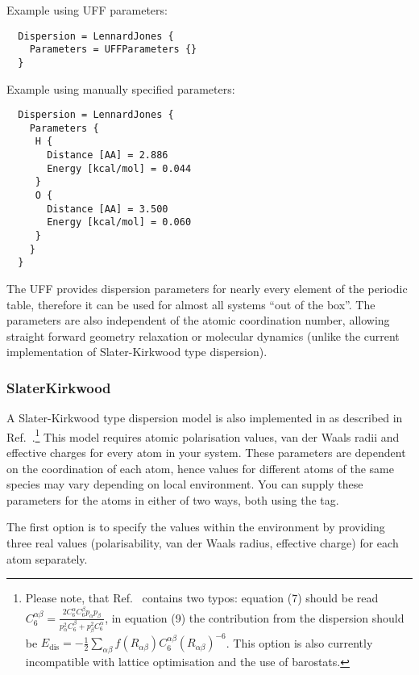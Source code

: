 Example using UFF parameters:\invparskip
\begin{verbatim}
  Dispersion = LennardJones {
    Parameters = UFFParameters {}
  }
\end{verbatim}

Example using manually specified parameters:\invparskip
\begin{verbatim}
  Dispersion = LennardJones {
    Parameters {
     H {
       Distance [AA] = 2.886
       Energy [kcal/mol] = 0.044
     }
     O {
       Distance [AA] = 3.500
       Energy [kcal/mol] = 0.060
     }
    }
  }
\end{verbatim}

The UFF provides dispersion parameters for nearly every element of the
periodic table, therefore it can be used for almost all systems
``out of the box''. The parameters are also independent of the atomic
coordination number, allowing straight forward geometry relaxation or
molecular dynamics (unlike the current implementation of
Slater-Kirkwood type dispersion).


\subsubsection{SlaterKirkwood}
\label{sec:dftbp.SlaterKirkwood}
\label{sec:SlaterKirkwood}

A Slater-Kirkwood type dispersion model is also implemented in
\dftbp{} as described in
Ref.~\cite{elstner-jcp-114-5149}.\footnote{Please note, that
  Ref.~\cite{elstner-jcp-114-5149} contains two typos: equation (7)
  should be read $C_6^{\alpha\beta} = \frac{2 C_6^\alpha C_6^\beta
    p_\alpha p_\beta}{p_\alpha^2 C_6^\beta + p_\beta^2 C_6^\alpha}$,
  in equation (9) the contribution from the dispersion should be
  $E_{\text{dis}} = -\frac{1}{2} \sum_{\alpha\beta}
  f(R_{\alpha\beta})C_6^{\alpha\beta}(R_{\alpha\beta})^{-6}$. This
  option is also currently incompatible with lattice optimisation and
  the use of barostats.}  This model requires atomic polarisation
values, van der Waals radii and effective charges for every atom in
your system. These parameters are dependent on the coordination of
each atom, hence values for different atoms of the same species may
vary depending on local environment.  You can supply these parameters
for the atoms in either of two ways, both using the
 tag.

The first option is to specify the values within the
 environment by providing three real values
(polarisability, van der Waals radius, effective charge) for each atom
separately.


